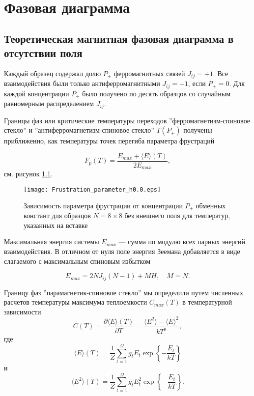 \chapter{Фазовая диаграмма}\label{ch:ch3}

\section{Теоретическая магнитная фазовая диаграмма в отсутствии поля} Каждый образец содержал долю $P_{+}$ ферромагнитных связей  $J_{ij}=+1$. Все взаимодействия были только антиферромагнитными $J_{ij}=-1$, если $P_{+}=0$. Для каждой концентрации $P_{+}$ было получено по десять образцов со случайным равномерным распределением $J_{ij}$. 

Границы фаз или критические температуры переходов ''ферромагнетизм-спиновое стекло''  и ''антиферромагнетизм-спиновое стекло'' $T(P_{+})$ получены приближенно, как температуры точек перегиба параметра фрустраций \cite{makarov2019} 

\begin{equation}
	F_p(T) = \frac{E_{max} + \langle E \rangle (T)}{2E_{max}},
	\label{eq:frustration_parameter}
\end{equation}
см. рисунок \ref{fig:fp0}. 

\begin{figure}[!ht]
	\centering
	\texttt{[image: Frustration\_parameter\_h0.0.eps]}
	\caption{Зависимость параметра фрустрации от концентрации $P_{+}$ обменных констант для образцов $N=8\times8$ без внешнего поля для температур, указанных на вставке}
	\label{fig:fp0}
\end{figure}

Максимальная энергия системы $E_{max}$ --- сумма по модулю всех парных энергий взаимодействия. В отличном от нуля поле энергия Зеемана добавляется в виде слагаемого с максимальным спиновым избытком

\begin{equation}
	E_{max} = 2NJ_{ij}(N-1) + MH, \quad M = N.
	\label{eq:Emax}
\end{equation}

Границу фаз ''парамагнетик-спиновое стекло'' мы определили путем численных расчетов температуры максимума теплоемкости $C_{max}(T)$ в температурной зависимости
\begin{equation}
	C(T)=\frac{\partial \langle E \rangle (T)}{\partial T}=\frac{\langle E^2 \rangle-\langle E \rangle ^2}{k T^2},
	\label{eq:ct}
\end{equation}
где
\begin{equation}
	\langle E \rangle (T) =\frac{1}{Z}\sum_{t=1}^{\Omega}g_t E_t \exp\left\{-\frac{E_t}{kT}\right\}
	\label{eq:ct}
\end{equation}
и
\begin{equation}
	\langle E^2 \rangle (T) =\frac{1}{Z}\sum_{t=1}^{\Omega}g_t E_t^2 \exp\left\{-\frac{E_t}{kT}\right\}.
	\label{eq:ct}
\end{equation}

